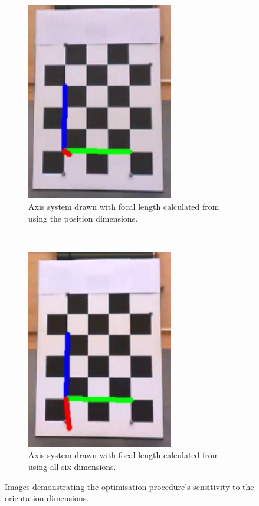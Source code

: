 \begin{figure}
  \begin{subfigure}[t]{0.48\textwidth}
    \centering
    \includegraphics[width=0.7\textwidth]{figures/chapter3/3_dim_optimisation}
    \caption{Axis system drawn with focal length calculated from using the position dimensions.}
  \end{subfigure}
  ~
  \begin{subfigure}[t]{0.48\textwidth}
    \centering
    \includegraphics[width=0.7\textwidth]{figures/chapter3/6_dim_optimisation}
    \caption{Axis system drawn with focal length calculated from using all six dimensions.}
  \end{subfigure}
  \caption{Images demonstrating the optimisation procedure's sensitivity to the orientation dimensions.}
  \label{fig:chap3-bad-optimisation}
\end{figure}

